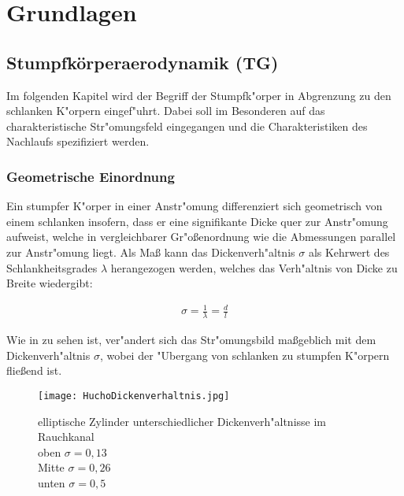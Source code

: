 \chapter{Grundlagen}\label{s:grundlagen}

\section{Stumpfk\"orperaerodynamik (TG)}


Im folgenden Kapitel wird der Begriff der Stumpfk"orper in Abgrenzung zu den schlanken K"orpern eingef"uhrt. Dabei soll im Besonderen auf das charakteristische Str"omungsfeld eingegangen und die Charakteristiken des Nachlaufs spezifiziert werden.

\subsection{Geometrische Einordnung}
Ein stumpfer K"orper in einer Anstr"omung differenziert sich geometrisch von einem schlanken insofern, dass er eine signifikante Dicke quer zur Anstr"omung aufweist, welche in vergleichbarer Gr"o\ss{}enordnung wie die Abmessungen parallel zur Anstr"omung liegt. Als Ma\ss{} kann das Dickenverh"altnis $\sigma$ als Kehrwert des Schlankheitsgrades $\lambda$ herangezogen werden, welches das Verh"altnis von Dicke zu Breite wiedergibt:

\begin{align}
\sigma = \frac{1}{\lambda} = \frac{d}{l}
\end{align}

Wie in  zu sehen ist, ver"andert sich das Str"omungsbild ma\ss{}geblich mit dem Dickenverh"altnis $\sigma$, wobei der "Ubergang von schlanken zu stumpfen K"orpern flie\ss{}end ist.

\begin{figure}[h]
	\centering
	\texttt{[image: HuchoDickenverhaltnis.jpg]}
	\caption{elliptische Zylinder unterschiedlicher Dickenverh"altnisse im Rauchkanal \cite{Hucho.2011} \\ oben $\sigma = 0,13$ \\ Mitte $\sigma = 0,26$ \\ unten $\sigma = 0,5$ }
	\label{fig:HuchoDV}
\end{figure}

